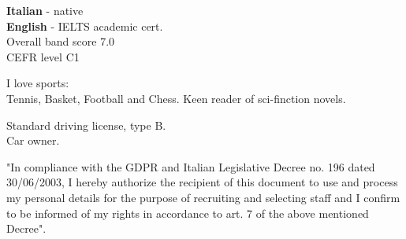\documentclass[9pt]{developercv} %
\begin{document}

\begin{minipage}[t]{0.3\textwidth}
	\vspace{-\baselineskip} %

	
	\textbf{Italian} - native\\
        \textbf{English} - IELTS academic cert.\\ Overall band score 7.0\\ CEFR level C1\\
\end{minipage}
\hfill
\begin{minipage}[t]{0.3\textwidth}
	\vspace{-\baselineskip} %
	

        I love sports:\\ Tennis, Basket, Football and  Chess.
        Keen reader of sci-finction novels.
	\end{minipage}
\hfill
\begin{minipage}[t]{0.3\textwidth}
	\vspace{-\baselineskip} %
	

        Standard driving license, type B.\\
	Car owner.
\end{minipage}

\vspace{0.5cm}

"In compliance with the GDPR and Italian Legislative Decree no. 196 dated 30/06/2003, I hereby authorize the recipient of this document to use and process my personal details for the purpose of recruiting and selecting staff and I confirm to be informed of my rights in accordance to art. 7 of the above mentioned Decree".




\end{document}
